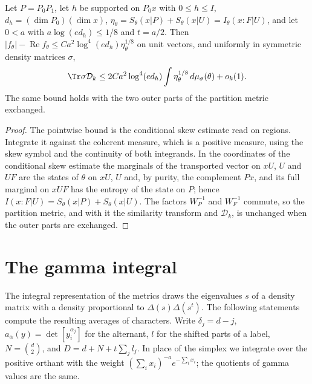\begin{theorem}
    \label{thm:skew_bound}
    \leanok
    Let $P=P_0P_1$, let $h$ be supported on $P_0x$ with $0\le h\le I$, $d_h=(\dim P_0)(\dim x)$,
    $\eta_\theta=S_\theta(x|P)+S_\theta(x|U)=I_\theta(x:F|U)$, and let $0<a$ with
    $a\log(ed_h)\le1/8$ and $t=a/2$. Then
    $|f_\theta|-\operatorname{Re}f_\theta\le Ca^2\log^4(ed_h)\eta_\theta^{1/8}$ on unit vectors,
    and uniformly in symmetric density matrices $\sigma$,
    \[
        \Tr\sigma\mathcal D_k\le2Ca^2\log^4(ed_h)\int\eta_\theta^{1/8}\,d\mu_\sigma(\theta)
        +o_k(1).
    \]
    The same bound holds with the two outer parts of the partition metric exchanged.
\end{theorem}

\begin{proof}\leanok
    The pointwise bound is the conditional skew estimate read on regions. Integrate it
    against the coherent measure, which is a positive measure, using the skew symbol and the
    continuity of both integrands. In the coordinates of the conditional skew estimate the
    marginals of the transported vector on $xU$, $U$ and $UF$ are the states of $\theta$ on
    $xU$, $U$ and, by purity, the complement $Px$, and its full marginal on $xUF$ has the
    entropy of the state on $P$; hence $I(x:F|U)=S_\theta(x|P)+S_\theta(x|U)$. The factors
    $W_P^{-1}$ and $W_F^{-1}$ commute, so the partition metric, and with it the similarity
    transform and $\mathcal D_k$, is unchanged when the outer parts are exchanged.
\end{proof}

\section{The gamma integral}

The integral representation of the metrics draws the eigenvalues $s$ of a density matrix with
a density proportional to $\Delta(s)\Delta(s^t)$. The following statements compute the
resulting averages of characters. Write $\delta_j=d-j$, $a_\alpha(y)=\det[y_i^{\alpha_j}]$ for
the alternant, $l$ for the shifted parts of a label, $N=\binom d2$, and
$D=d+N+t\sum_jl_j$. In place of the simplex we integrate over the positive orthant with the
weight $(\sum_ix_i)^{-a}e^{-\sum_ix_i}$; the quotients of gamma values are the same.

